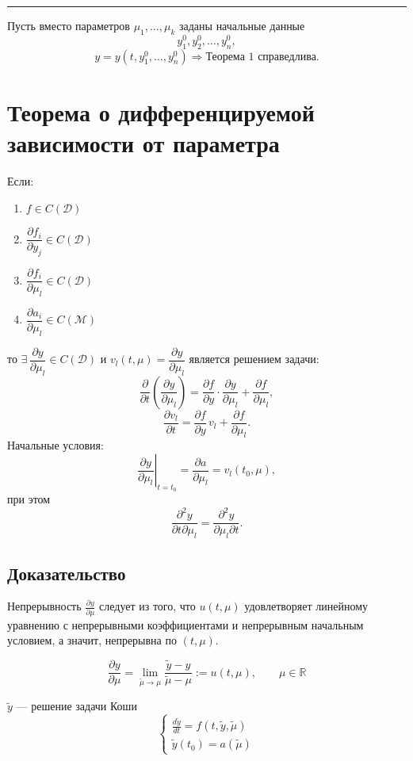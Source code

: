 \documentclass[a4paper,12pt]{article}
\begin{document}
\hrule
\vspace{0.5cm}

Пусть вместо параметров $\mu_1, \dots, \mu_k$ заданы начальные данные 
\[
    y_1^0, y_2^0, \dots, y_n^0,
\]
\[
    y = y(t, y_1^0, \dots, y_n^0) \Rightarrow \text{Теорема 1 справедлива.}
\]

\section{Теорема о дифференцируемой зависимости от параметра}
Если:
\begin{enumerate}[label=\arabic*)]
    \item $f \in C(\mathcal{D})$
    \item $\dfrac{\partial f_i}{\partial y_j} \in C(\mathcal{D})$
    \item $\dfrac{\partial f_i}{\partial \mu_l} \in C(\mathcal{D})$
    \item $\dfrac{\partial a_i}{\partial \mu_l} \in C(\mathcal{M})$
\end{enumerate}
то $\exists \, \dfrac{\partial y}{\partial \mu_l} \in C(\mathcal{D})$ и $v_l(t, \mu) = \dfrac{\partial y}{\partial \mu_l}$ является решением задачи:
\[
    \frac{\partial}{\partial t} \left( \frac{\partial y}{\partial \mu_l} \right) = \frac{\partial f}{\partial y} \cdot \frac{\partial y}{\partial \mu_l} + \frac{\partial f}{\partial \mu_l},
\]
\[
    \frac{\partial v_l}{\partial t} = \frac{\partial f}{\partial y} \, v_l + \frac{\partial f}{\partial \mu_l}.
\]
Начальные условия:
\[
    \left. \frac{\partial y}{\partial \mu_l} \right|_{t = t_0} = \frac{\partial a}{\partial \mu_l} = v_l(t_0, \mu),
\]
при этом
\[
    \frac{\partial^2 y}{\partial t \partial \mu_l} = \frac{\partial^2 y}{\partial \mu_l \partial t}.
\]

\subsection*{Доказательство}
Непрерывность $\frac{\partial y}{\partial \mu}$ следует из того, что $u(t,\mu)$ удовлетворяет линейному уравнению с непрерывными коэффициентами и непрерывным начальным условием, а значит, непрерывна по $(t,\mu)$.

\[
    \frac{\partial y}{\partial \mu} = \lim_{\tilde{\mu} \to \mu} \frac{\tilde{y} - y}{\tilde{\mu} - \mu} := u(t, \mu),  \qquad
    \mu \in \mathbb{R}
\]

$\tilde{y}$ — решение задачи Коши 
\[
    \begin{cases} 
        \frac{d\tilde{y}}{dt} = f(t, \tilde{y}, \tilde{\mu}) \\ 
        \tilde{y}(t_0) = a(\tilde{\mu}) 
    \end{cases}
\]
\end{document}
